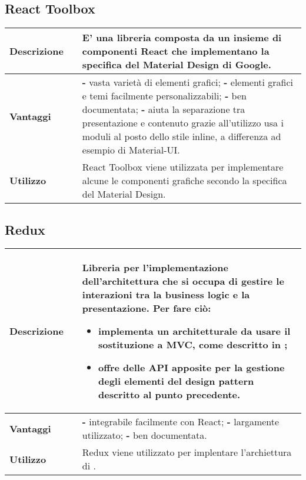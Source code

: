 \subsection{React Toolbox}
\label{React Toolbox}
\begin{table}[H]
	\centering
	\begin{tabular}{p{2cm}p{0.5cm}p{11.5cm}}
		\arrayrulecolor{lightgray}
		\toprule
		\textbf{Descrizione} & &
		E' una libreria \js{} composta da un insieme di componenti React che implementano la specifica del Material Design di Google.
		\\ \midrule
		\textbf{Vantaggi} & &
		\textbf{- } vasta varietà di elementi grafici; \newline
		\textbf{- } elementi grafici e temi facilmente personalizzabili; \newline
		\textbf{- } ben documentata; \newline
		\textbf{- } aiuta la separazione tra presentazione e contenuto grazie all'utilizzo usa i moduli \glo{CSS}{CSS} al posto dello stile inline, a differenza ad esempio di Material-UI.
		\\ \midrule
		\textbf{Utilizzo} & &
		React Toolbox viene utilizzata per implementare alcune le componenti grafiche secondo la specifica del Material Design.
		\\\bottomrule
	\end{tabular}
\end{table}



\newpage
\subsection{Redux}
\label{Redux}
\begin{table}[H]
	\centering
	\begin{tabular}{p{2cm}p{0.5cm}p{11.5cm}}
		\arrayrulecolor{lightgray}
		\toprule
		\textbf{Descrizione} & &
		Libreria per l’implementazione dell’architettura che si occupa di gestire le interazioni tra la business logic e la presentazione.
		Per fare ciò:
		\begin{itemize}
			\item implementa un \glo{Design pattern}{design pattern} architetturale da usare il sostituzione a MVC, come descritto in
			\nameref{dp_redux};
			\item offre delle API apposite per la gestione degli elementi del design pattern descritto al punto precedente.
		\end{itemize}
		\\ \midrule
		\textbf{Vantaggi} & &
		\textbf{- } integrabile facilmente con React; \newline
		\textbf{- } largamente utilizzato; \newline
		\textbf{- } ben documentata.
		\\ \midrule
		\textbf{Utilizzo} & &
		Redux viene utilizzato per implentare l'archiettura di \progetto.
		\\\bottomrule
	\end{tabular}
\end{table}



